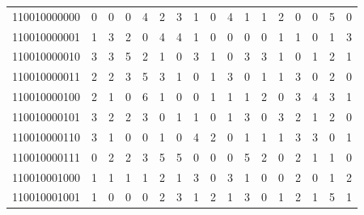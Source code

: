 \documentclass[10pt,a4paper]{article}
\begin{document}
\begin{longtable}{ |c|c|c|c|c|c|c|c|c|c|c|c|c|c|c|c|c| }
    110010000000              & 0                            & 0                                & 0                            & 4                              & 2   & 3   & 1   & 0   & 4   & 1   & 1   & 2   & 0   & 0   & 5   & 0   \\
    110010000001              & 1                            & 3                                & 2                            & 0                              & 4   & 4   & 1   & 0   & 0   & 0   & 0   & 1   & 1   & 0   & 1   & 3   \\
    110010000010              & 3                            & 3                                & 5                            & 2                              & 1   & 0   & 3   & 1   & 0   & 3   & 3   & 1   & 0   & 1   & 2   & 1   \\
    110010000011              & 2                            & 2                                & 3                            & 5                              & 3   & 1   & 0   & 1   & 3   & 0   & 1   & 1   & 3   & 0   & 2   & 0   \\
    110010000100              & 2                            & 1                                & 0                            & 6                              & 1   & 0   & 0   & 1   & 1   & 1   & 2   & 0   & 3   & 4   & 3   & 1   \\
    110010000101              & 3                            & 2                                & 2                            & 3                              & 0   & 1   & 1   & 0   & 1   & 3   & 0   & 3   & 2   & 1   & 2   & 0   \\
    110010000110              & 3                            & 1                                & 0                            & 0                              & 1   & 0   & 4   & 2   & 0   & 1   & 1   & 1   & 3   & 3   & 0   & 1   \\
    110010000111              & 0                            & 2                                & 2                            & 3                              & 5   & 5   & 0   & 0   & 0   & 5   & 2   & 0   & 2   & 1   & 1   & 0   \\
    110010001000              & 1                            & 1                                & 1                            & 1                              & 2   & 1   & 3   & 0   & 3   & 1   & 0   & 0   & 2   & 0   & 1   & 2   \\
    110010001001              & 1                            & 0                                & 0                            & 0                              & 2   & 3   & 1   & 2   & 1   & 3   & 0   & 1   & 2   & 1   & 5   & 1   \\

\end{longtable}
\end{document}
